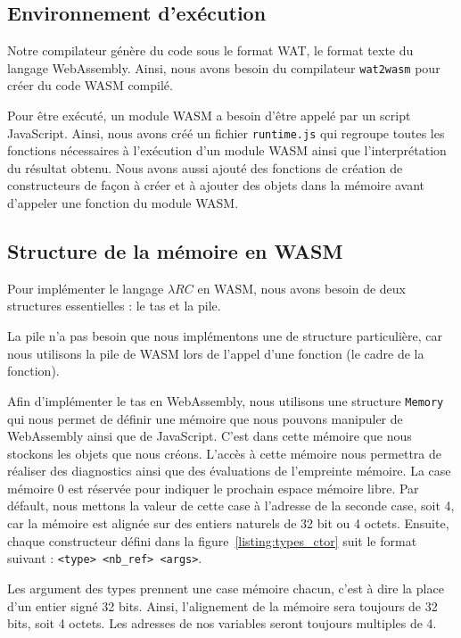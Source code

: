 \documentclass{rapportECL}
\begin{document}

\subsection{Environnement d'exécution}

Notre compilateur génère du code sous le format WAT, le format texte du langage WebAssembly. Ainsi, nous avons besoin
du compilateur \verb|wat2wasm| pour créer du code WASM compilé.

Pour être exécuté, un module WASM a besoin d'être appelé par un script JavaScript. Ainsi, nous avons créé un fichier \verb|runtime.js| qui regroupe toutes les fonctions nécessaires à l'exécution d'un module WASM ainsi que l'interprétation du résultat obtenu. Nous avons aussi ajouté des fonctions de création de constructeurs de façon à créer et à ajouter des objets dans la mémoire avant d'appeler une fonction du module WASM.

\subsection{Structure de la mémoire en WASM}

Pour implémenter le langage $\lambda{RC}$ en WASM, nous avons besoin de deux structures essentielles : le tas et la pile.

La pile n'a pas besoin que nous implémentons une de structure particulière, car nous utilisons la pile de WASM lors de l'appel d'une fonction (le cadre de la fonction).

\medskip

Afin d'implémenter le tas en WebAssembly, nous utilisons une structure \verb|Memory| qui nous permet de définir une mémoire que nous pouvons manipuler de WebAssembly ainsi que de JavaScript.
C'est dans cette mémoire que nous stockons les objets que nous créons.
L'accès à cette mémoire nous permettra de réaliser des diagnostics ainsi que des évaluations de l'empreinte mémoire.
La case mémoire 0 est réservée pour indiquer le prochain espace mémoire libre. Par défault, nous mettons la valeur de cette case à 
l'adresse de la seconde case, soit 4, car la mémoire est alignée sur des entiers naturels de 32 bit ou 4 octets.
Ensuite, chaque constructeur défini dans la figure~\ref{listing:types_ctor} suit le format suivant : \verb|<type> <nb_ref> <args>|. 

Les argument des types prennent une case mémoire chacun, c'est à dire la place d'un entier signé 32 bits. 
Ainsi, l'alignement de la mémoire sera toujours de 32 bits, soit 4 octets. Les adresses de nos variables seront toujours 
multiples de 4.
\end{document}
